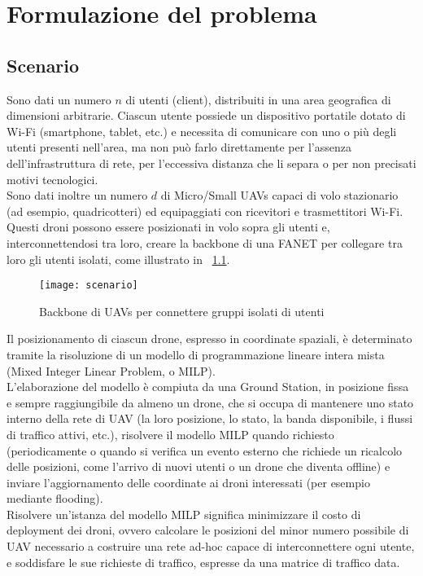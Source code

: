  \chapter{Formulazione del problema} \label{chap:formulazione}

\ifpdf
    \graphicspath{{Chapter3/Figs/Raster/}{Chapter3/Figs/PDF/}{Chapter3/Figs/}}
\else
    \graphicspath{{Chapter3/Figs/Vector/}{Chapter3/Figs/}}
\fi

\section{Scenario}
Sono dati un numero $n$ di utenti (client), distribuiti in una area geografica di dimensioni arbitrarie. 
Ciascun utente possiede un dispositivo portatile dotato di Wi-Fi (smartphone, tablet, etc.) e necessita di comunicare con uno o più degli utenti presenti nell'area, ma non può farlo direttamente per l'assenza dell'infrastruttura di rete, per l'eccessiva distanza che li separa o per non precisati motivi tecnologici. \\
Sono dati inoltre un numero $d$ di Micro/Small UAVs capaci di volo stazionario (ad esempio, quadricotteri) ed equipaggiati con ricevitori e trasmettitori Wi-Fi. 
Questi droni possono essere posizionati in volo sopra gli utenti e, interconnettendosi tra loro, creare la backbone di una FANET per collegare tra loro gli utenti isolati, come illustrato in \figurename\ \ref{fig:scenario}. \\

\begin{figure}
	\begin{center}
		\texttt{[image: scenario]}
	\end{center}
	\caption{Backbone di UAVs per connettere gruppi isolati di utenti} \label{fig:scenario}
\end{figure}

Il posizionamento di ciascun drone, espresso in coordinate spaziali, è determinato tramite la risoluzione di un modello di programmazione lineare intera mista (Mixed Integer Linear Problem, o MILP). \\
L'elaborazione del modello è compiuta da una Ground Station, in posizione fissa e sempre raggiungibile da almeno un drone, che si occupa di mantenere uno stato interno della rete di UAV (la loro posizione, lo stato, la banda disponibile, i flussi di traffico attivi, etc.), risolvere il modello MILP quando richiesto (periodicamente o quando si verifica un evento esterno che richiede un ricalcolo delle posizioni, come l'arrivo di nuovi utenti o un drone che diventa offline) e inviare l'aggiornamento delle coordinate ai droni interessati (per esempio mediante flooding). \\
Risolvere un'istanza del modello MILP significa minimizzare il costo di deployment dei droni, ovvero calcolare le posizioni del minor numero possibile di UAV necessario a costruire una rete ad-hoc capace di interconnettere ogni utente, e soddisfare le sue richieste di traffico, espresse da una matrice di traffico data. \\

